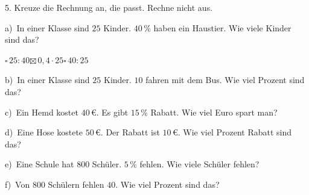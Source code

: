 \documentclass[11pt]{article}
\newcommand{\grau}[1]{{\color{mbgrau}#1}}
\begin{document}
\begin{pfaufg}{}{5.}{}
Kreuze die Rechnung an, die passt. Rechne nicht aus.\par\medskip
\grau{a)\ In einer Klasse sind $25$ Kinder. $40\,\%$ haben ein Haustier. Wie viele Kinder sind das?\par\hspace*{1.2em}$\square$\,$25 : 40$\hspace{0.9em}$\boxtimes$\,$0{,}4 \cdot 25$\hspace{0.9em}$\square$\,$40 : 25$\hspace{0.9em}}\par\medskip
b)\ In einer Klasse sind $25$ Kinder. $10$ fahren mit dem Bus. Wie viel Prozent sind das?\par\hspace*{1.2em}\par\medskip
c)\ Ein Hemd kostet $40\,€$. Es gibt $15\,\%$ Rabatt. Wie viel Euro spart man?\par\hspace*{1.2em}\par\medskip
d)\ Eine Hose kostete $50\,€$. Der Rabatt ist $10\,€$. Wie viel Prozent Rabatt sind das?\par\hspace*{1.2em}\par\medskip
e)\ Eine Schule hat $800$ Schüler. $5\,\%$ fehlen. Wie viele Schüler fehlen?\par\hspace*{1.2em}\par\medskip
f)\ Von $800$ Schülern fehlen $40$. Wie viel Prozent sind das?\par\hspace*{1.2em}\par
{}
\end{pfaufg}
\end{document}
